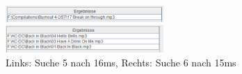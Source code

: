 \documentclass[12pt,a4paper,ngerman]{report}
\begin{document}
\begin{figure}[h!]
\centering
	\begin{minipage}[b]{7cm}
	\includegraphics[width=6cm]{img/search5_stoAn_16.PNG}
	\end{minipage}
	\begin{minipage}[b]{7cm}
	\includegraphics[width=6cm]{img/search6_stoAn_15.PNG}
	\end{minipage}
\caption{Links: Suche 5 nach 16ms, Rechts: Suche 6 nach 15ms\protect\footnotemark}
\end{figure}
\newpage
\end{document}
